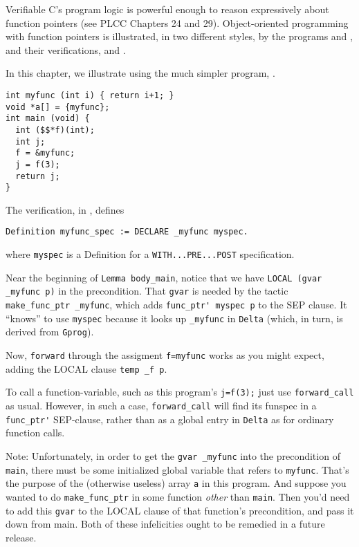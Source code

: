 \documentclass[12pt,fleqn,openany,oneside,showtrims]{memoir}
\begin{document}
Verifiable C's program logic is powerful enough to reason expressively
about function pointers (see PLCC Chapters 24 and 29).  Object-oriented
programming with function pointers is illustrated, in two different
styles, by the programs  and ,
and their verifications,
 and .

In this chapter, we illustrate using the much simpler program,
.
\begin{lstlisting}
int myfunc (int i) { return i+1; }
void *a[] = {myfunc};
int main (void) {
  int ($$*f)(int);
  int j;
  f = &myfunc;
  j = f(3);
  return j;
}
\end{lstlisting}
The verification, in , defines
\begin{lstlisting}
Definition myfunc_spec := DECLARE _myfunc myspec.
\end{lstlisting}
where \lstinline{myspec} is
a Definition for a \lstinline{WITH...PRE...POST} specification.

Near the beginning of \lstinline{Lemma body_main},
notice that we have \linebreak
\lstinline{LOCAL (gvar _myfunc p)} in the precondition.
That \lstinline{gvar} is needed by
the tactic \lstinline{make_func_ptr _myfunc},
which adds \lstinline{func_ptr' myspec p} to the SEP clause.
It ``knows'' to use \lstinline{myspec} because it looks
up \lstinline{_myfunc} in
\lstinline{Delta} (which, in turn, is derived from \lstinline{Gprog}).

Now, \lstinline{forward} through the assigment \lstinline{f=myfunc}
works as you might expect, adding the LOCAL clause
\lstinline{temp _f p}.

To call a function-variable, such as this program's \lstinline{j=f(3);}
just use \lstinline{forward_call} as usual.  However, in such a case,
\lstinline{forward_call} will find its funspec in a
\lstinline{func_ptr'} SEP-clause, rather than as a global entry
in \lstinline{Delta} as for ordinary function calls.

Note:  Unfortunately, in order to get the \lstinline{gvar _myfunc} into the
precondition of \lstinline{main},
there must be some initialized global variable that refers to
\lstinline{myfunc}.  That's the purpose of the (otherwise useless)
array \lstinline{a} in this program.
And suppose you wanted to do \lstinline{make_func_ptr} in
some function \emph{other} than \lstinline{main}.  Then you'd
need to add this \lstinline{gvar} to the LOCAL clause of that
function's precondition, and pass it down from main.
Both of these infelicities ought to be remedied in a future release.
\end{document}
